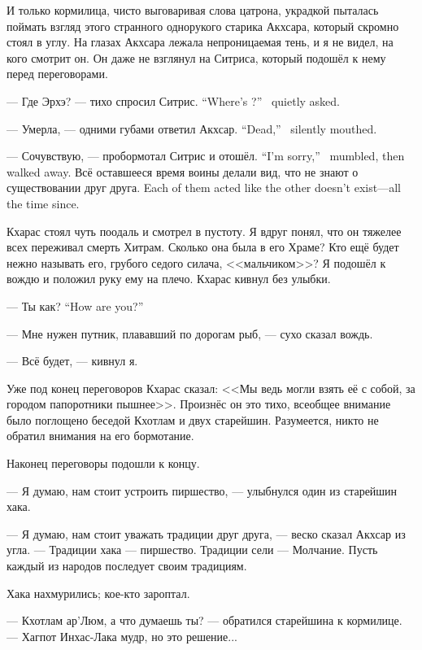 И только кормилица, чисто выговаривая слова цатрона, украдкой пыталась поймать взгляд этого странного однорукого старика Акхсара, который скромно стоял в углу.
На глазах Акхсара лежала непроницаемая тень, и я не видел, на кого смотрит он.
Он даже не взглянул на Ситриса, который подошёл к нему перед переговорами.

{--- Где Эрхэ? --- тихо спросил Ситрис.}
{``Where's \Oerchoe?'' \Sitris\ quietly asked.}

{--- Умерла, --- одними губами ответил Акхсар.}
{``Dead,'' \Akchsar\ silently mouthed.}

{--- Сочувствую, --- пробормотал Ситрис и отошёл.}
{``I'm sorry,'' \Sitris\ mumbled, then walked away.}
{Всё оставшееся время воины делали вид, что не знают о существовании друг друга.}
{Each of them acted like the other doesn't exist---all the time since.}

Кхарас стоял чуть поодаль и смотрел в пустоту.
Я вдруг понял, что он тяжелее всех переживал смерть Хитрам.
Сколько она была в его Храме?
Кто ещё будет нежно называть его, грубого седого силача, <<мальчиком>>?
Я подошёл к вождю и положил руку ему на плечо.
Кхарас кивнул без улыбки.

{--- Ты как?}
{``How are you?''}

--- Мне нужен путник, плававший по дорогам рыб\FM, --- сухо сказал вождь.

--- Всё будет, --- кивнул я.

Уже под конец переговоров Кхарас сказал: <<Мы ведь могли взять её с собой, за городом папоротники пышнее>>.
Произнёс он это тихо, всеобщее внимание было поглощено беседой Кхотлам и двух старейшин.
Разумеется, никто не обратил внимания на его бормотание.

\asterism

Наконец переговоры подошли к концу.

--- Я думаю, нам стоит устроить пиршество, --- улыбнулся один из старейшин хака.

--- Я думаю, нам стоит уважать традиции друг друга, --- веско сказал Акхсар из угла.
--- Традиции хака --- пиршество.
Традиции сели --- Молчание.
Пусть каждый из народов последует своим традициям.

Хака нахмурились;
кое-кто зароптал.

--- Кхотлам ар'Люм, а что думаешь ты? --- обратился старейшина к кормилице.
--- Хагпот Инхас-Лака мудр, но это решение...

